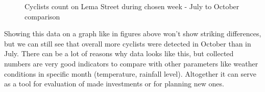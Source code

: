 \begin{figure}[h]
    \centering
    \caption{Cyclists count on Lema Street during chosen week - July to October comparison}
    \label{fig:lemaCount}
\end{figure}

Showing this data on a graph like in figures above won't show striking differences, but we can still see that overall more cyclists were detected in October than in July. There can be a lot of reasons why data looks like this, but collected numbers are very good indicators to compare with other parameters like weather conditions in specific month (temperature, rainfall level). Altogether it can serve as a tool for evaluation of made investments or for planning new ones.